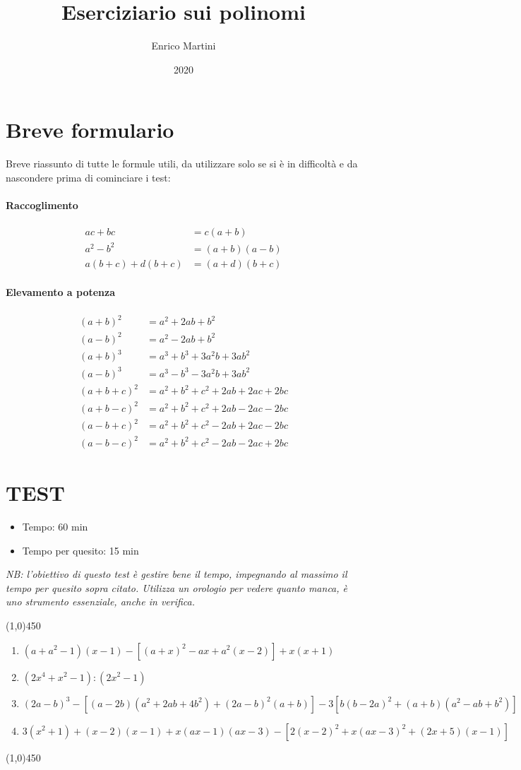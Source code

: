 \documentclass[a4paper]{article}
\title{Eserciziario sui polinomi}
\date{2020}
\author{Enrico Martini}
\begin{document}
\maketitle
\tableofcontents
\newpage
\setcounter{section}{-1}
\section{Breve formulario}
Breve riassunto di tutte le formule utili, da utilizzare solo se si è in difficoltà e da nascondere prima di cominciare i test:
\paragraph{Raccoglimento}
\begin{align*}
	ac + bc &= c(a+b)\\
	a^2-b^2 &= (a+b)(a-b)\\
	a(b+c) + d(b+c) &= (a+d)(b+c)
\end{align*}
\paragraph{Elevamento a potenza}
\begin{align*}
(a+b)^2 &= a^2 + 2ab + b^2\\
(a-b)^2 &= a^2 - 2ab + b^2\\
(a+b)^3 &= a^3 + b^3 + 3a^2b + 3ab^2\\
(a-b)^3 &= a^3 - b^3 - 3a^2b + 3ab^2\\
(a+b+c)^2 &= a^2 + b^2 + c^2 + 2ab + 2ac + 2bc\\
(a+b-c)^2 &= a^2 + b^2 + c^2 + 2ab - 2ac - 2bc\\
(a-b+c)^2 &= a^2 + b^2 + c^2 - 2ab + 2ac - 2bc\\
(a-b-c)^2 &= a^2 + b^2 + c^2 - 2ab - 2ac + 2bc
\end{align*}

\newpage
\section{TEST }
\begin{itemize}
\item Tempo: 60 min
\item Tempo per quesito: 15 min 
\end{itemize}
\textit{NB: l'obiettivo di questo test è gestire bene il tempo, impegnando al massimo il tempo per quesito sopra citato. Utilizza un orologio per vedere quanto manca, è uno strumento essenziale, anche in verifica.}
\begin{center}
\line(1,0){450}
\end{center}
\begin{enumerate}
\item $(a+a^2-1)(x-1)-[(a+x)^2-ax+a^2(x-2)]+x(x+1)$	%
\item $(2x^4+x^2-1):(2x^2-1)$
\item $(2a-b)^3-[(a-2b)(a^2+2ab+4b^2)+(2a-b)^2(a+b)]-3[b(b-2a)^2+(a+b)(a^2-ab+b^2)]$	%
\item $3(x^2+1)+(x-2)(x-1)+x(ax-1)(ax-3)-[2(x-2)^2+x(ax-3)^2+(2x+5)(x-1)]$
\end{enumerate}
\begin{center}
	\line(1,0){450}
\end{center}
\end{document}
